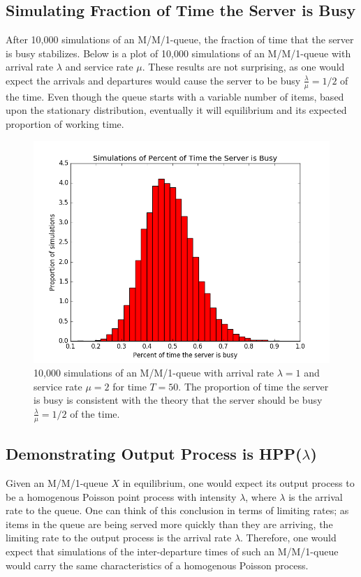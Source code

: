 \documentclass[11pt, oneside]{article}
\begin{document}
\subsection{Simulating Fraction of Time the Server is Busy}
After 10,000 simulations of an M/M/1-queue, the fraction of time that the server is busy stabilizes. Below is a plot of 10,000 simulations of an M/M/1-queue with arrival rate $\lambda$ and service rate $\mu$. These results are not surprising, as  one would expect the arrivals and departures would cause the server to be busy $\frac{\lambda}{\mu}=1/2$ of the time. Even though the queue starts with a variable number of items, based upon the stationary distribution, eventually it will equilibrium and its expected proportion of working time.
\begin{figure}[H]
\includegraphics[scale=0.6]{busy_server}
\caption{10,000 simulations of an M/M/1-queue with arrival rate $\lambda=1$ and service rate $\mu=2$ for time $T=50$. The proportion of time the server is busy is consistent with the theory that the server should be busy $\frac{\lambda}{\mu}=1/2$ of the time.}
\label{fig:x}
\end{figure}

\subsection{Demonstrating Output Process is HPP($\lambda$)}
Given an M/M/1-queue $X$ in equilibrium, one would expect its output process to be a homogenous Poisson point process with intensity $\lambda$, where $\lambda$ is the arrival rate to the queue. One can think of this conclusion in terms of limiting rates; as items in the queue are being served more quickly than they are arriving, the limiting rate to the output process is the arrival rate $\lambda$. Therefore, one would expect that simulations of the inter-departure times of such an M/M/1-queue would carry the same characteristics of a homogenous Poisson process. 
\end{document}
